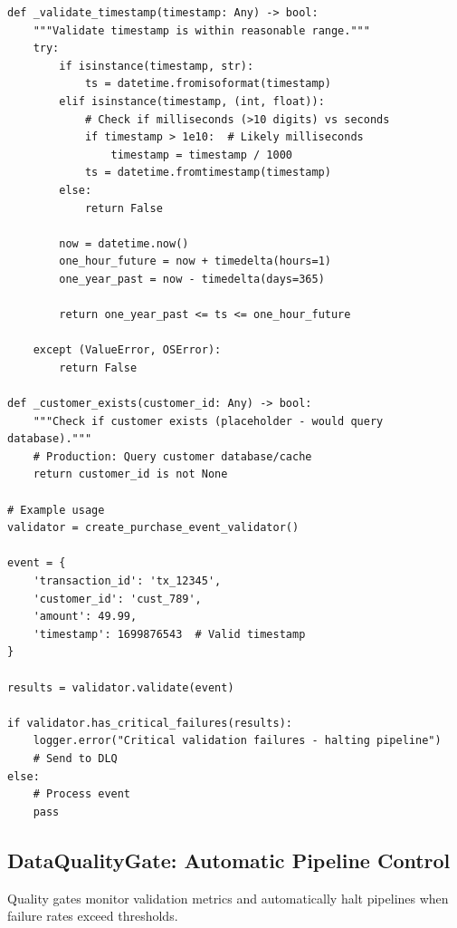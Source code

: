 \begin{lstlisting}[style=python, caption={Quality Validation Rules}]
def _validate_timestamp(timestamp: Any) -> bool:
    """Validate timestamp is within reasonable range."""
    try:
        if isinstance(timestamp, str):
            ts = datetime.fromisoformat(timestamp)
        elif isinstance(timestamp, (int, float)):
            # Check if milliseconds (>10 digits) vs seconds
            if timestamp > 1e10:  # Likely milliseconds
                timestamp = timestamp / 1000
            ts = datetime.fromtimestamp(timestamp)
        else:
            return False

        now = datetime.now()
        one_hour_future = now + timedelta(hours=1)
        one_year_past = now - timedelta(days=365)

        return one_year_past <= ts <= one_hour_future

    except (ValueError, OSError):
        return False

def _customer_exists(customer_id: Any) -> bool:
    """Check if customer exists (placeholder - would query database)."""
    # Production: Query customer database/cache
    return customer_id is not None

# Example usage
validator = create_purchase_event_validator()

event = {
    'transaction_id': 'tx_12345',
    'customer_id': 'cust_789',
    'amount': 49.99,
    'timestamp': 1699876543  # Valid timestamp
}

results = validator.validate(event)

if validator.has_critical_failures(results):
    logger.error("Critical validation failures - halting pipeline")
    # Send to DLQ
else:
    # Process event
    pass
\end{lstlisting}

\subsection{DataQualityGate: Automatic Pipeline Control}

Quality gates monitor validation metrics and automatically halt pipelines when failure rates exceed thresholds.

